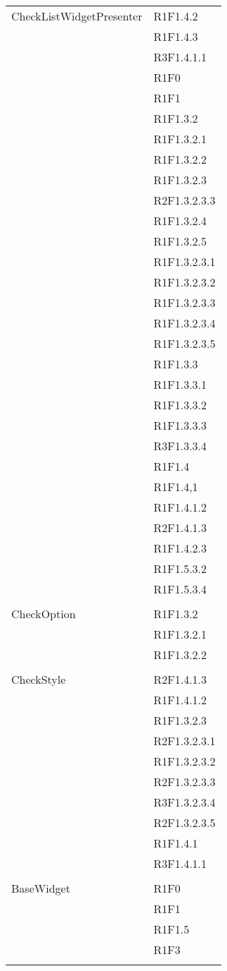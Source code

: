 \begin{center}
\begin{longtable}{|p{7cm}|p{7cm}|}
		CheckListWidgetPresenter & R1F1.4.2 \\ & R1F1.4.3 \\ & R3F1.4.1.1 \\ & R1F0 \\ & R1F1 \\ & R1F1.3.2 \\ & R1F1.3.2.1 \\ & R1F1.3.2.2 \\ & R1F1.3.2.3 \\ & R2F1.3.2.3.3 \\ & R1F1.3.2.4 \\ & R1F1.3.2.5 \\ & R1F1.3.2.3.1 \\ & R1F1.3.2.3.2 \\ & R1F1.3.2.3.3 \\ & R1F1.3.2.3.4 \\ & R1F1.3.2.3.5 \\ & R1F1.3.3 \\ & R1F1.3.3.1 \\ & R1F1.3.3.2 \\ & R1F1.3.3.3 \\ & R3F1.3.3.4 \\ & R1F1.4 \\ & R1F1.4,1 \\ & R1F1.4.1.2 \\ & R2F1.4.1.3 \\ & R1F1.4.2.3 \\ & R1F1.5.3.2 \\ & R1F1.5.3.4 \\ & \\ \hline
		CheckOption & R1F1.3.2 \\ & R1F1.3.2.1 \\ & R1F1.3.2.2 \\ & \\ \hline
		CheckStyle & R2F1.4.1.3 \\ & R1F1.4.1.2 \\ & R1F1.3.2.3 \\ & R2F1.3.2.3.1 \\ & R1F1.3.2.3.2 \\ & R2F1.3.2.3.3 \\ & R3F1.3.2.3.4 \\ & R2F1.3.2.3.5 \\ & R1F1.4.1 \\ & R3F1.4.1.1 \\ & \\ \hline
		BaseWidget & R1F0 \\ & R1F1 \\ & R1F1.5 \\ & R1F3 \\ & \\ \hline

\end{longtable}
\end{center}
